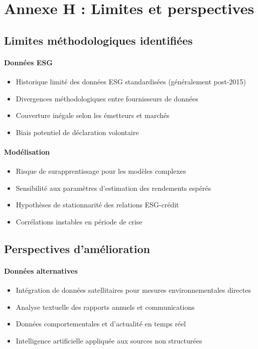 \section{Annexe H : Limites et perspectives}

\subsection{Limites méthodologiques identifiées}

\paragraph{Données ESG}
\begin{itemize}
\item Historique limité des données ESG standardisées (généralement post-2015)
\item Divergences méthodologiques entre fournisseurs de données
\item Couverture inégale selon les émetteurs et marchés
\item Biais potentiel de déclaration volontaire
\end{itemize}

\paragraph{Modélisation}
\begin{itemize}
\item Risque de surapprentissage pour les modèles complexes
\item Sensibilité aux paramètres d'estimation des rendements espérés
\item Hypothèses de stationnarité des relations ESG-crédit
\item Corrélations instables en période de crise
\end{itemize}

\subsection{Perspectives d'amélioration}

\paragraph{Données alternatives}
\begin{itemize}
\item Intégration de données satellitaires pour mesures environnementales directes
\item Analyse textuelle des rapports annuels et communications
\item Données comportementales et d'actualité en temps réel
\item Intelligence artificielle appliquée aux sources non structurées
\end{itemize}

